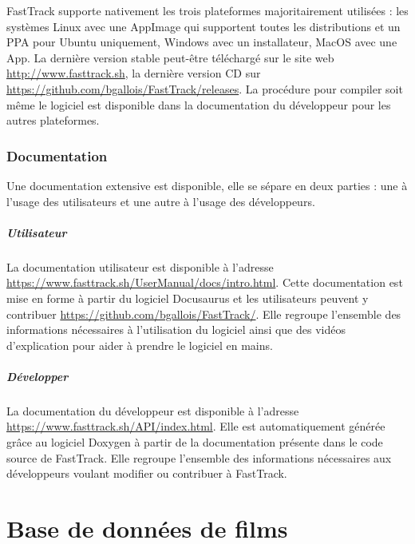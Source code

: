 		FastTrack supporte nativement les trois plateformes majoritairement utilisées : les systèmes Linux avec une AppImage qui supportent toutes les distributions et un PPA pour Ubuntu uniquement, Windows avec un installateur, MacOS avec une App. La dernière version stable peut-être téléchargé sur le site web \url{http://www.fasttrack.sh}, la dernière version CD sur \url{https://github.com/bgallois/FastTrack/releases}. La procédure pour compiler soit même le logiciel est disponible dans la documentation du développeur pour les autres plateformes.
		
		\subsection{Documentation}
		Une documentation extensive est disponible, elle se sépare en deux parties : une à l'usage des utilisateurs et une autre à l'usage des développeurs.
		
		\paragraph{Utilisateur} La documentation utilisateur est disponible à l'adresse \url{https://www.fasttrack.sh/UserManual/docs/intro.html}. Cette documentation est mise en forme à partir du logiciel Docusaurus et les utilisateurs peuvent y contribuer \url{https://github.com/bgallois/FastTrack/}. Elle regroupe l'ensemble des informations nécessaires à l'utilisation du logiciel ainsi que des vidéos d'explication pour aider à prendre le logiciel en mains.
		
		\paragraph{Développer} La documentation du développeur est disponible à l'adresse \url{https://www.fasttrack.sh/API/index.html}. Elle est automatiquement générée grâce au logiciel Doxygen à partir de la documentation présente dans le code source de FastTrack. Elle regroupe l'ensemble des informations nécessaires aux développeurs voulant modifier ou contribuer à FastTrack.

		
\chapter{Base de données de films}
    
